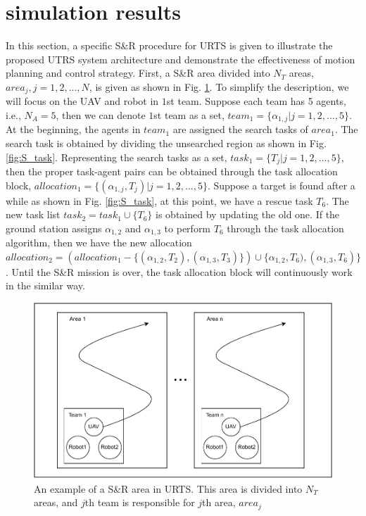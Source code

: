 \documentclass{ieeeaccess}
\begin{document}
\section{simulation results}
In this section, a specific S\&R procedure for URTS is given to illustrate the proposed UTRS system architecture and demonstrate the effectiveness of motion planning and control strategy. First, a S\&R area divided into $N_T$ areas, $area_j,j=1,2,...,N$, is given as shown in Fig. \ref{fig:SR_area}. To simplify the description, we will focus on the UAV and robot in $1$st team. Suppose each team has 5 agents, i.e., $N_A=5$, then we can denote $1$st team as a set, $team_1=\{ \alpha_{1,j} | j=1,2,...,5 \}$. At the beginning, the agents in $team_1$ are assigned the search tasks of $area_1$. The search task is obtained by dividing the unsearched region as shown in Fig. \ref{fig:S_task}. Representing the search tasks as a set, $task_1=\{ T_j | j=1,2,...,5 \}$, then the proper task-agent pairs can be obtained through the task allocation block, $allocation_1=\{ (\alpha_{1,j},T_j) | j=1,2,...,5 \}$. Suppose a target is found after a while as shown in Fig. \ref{fig:S_task}, at this point, we have a rescue task $T_6$. The new task list $task_2=task_1\cup\{ T_6 \}$ is obtained by updating the old one. If the ground station assigns $\alpha_{1,2}$ and $\alpha_{1,3}$ to perform $T_6$ through the task allocation algorithm, then we have the new allocation $allocation_2=(allocation_1-\{ (\alpha_{1,2},T_2),(\alpha_{1,3},T_3) \})\cup\{ \alpha_{1,2},T_6),(\alpha_{1,3},T_6) \}$. Until the S\&R mission is over, the task allocation block will continuously work in the similar way.
\begin{figure}[htbp]
    \centering
    \includegraphics[scale=.42]{fig/1.pdf}\caption{An example of a S\&R area in URTS. This area is divided into $N_T$ areas, and $j$th team is responsible for $j$th area, $area_j$}%
    \label{fig:SR_area}
\end{figure}
\end{document}
